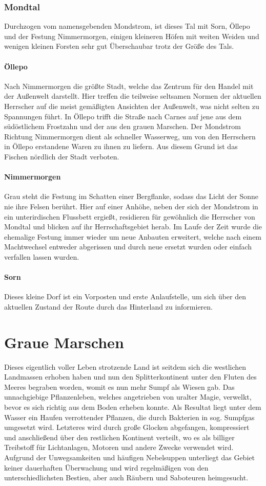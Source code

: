 \documentclass[a4paper,12pt,oneside]{book}
\begin{document}
\subsubsection{Mondtal}
Durchzogen vom namensgebenden Mondstrom, ist dieses Tal mit Sorn, Öllepo und der Festung Nimmermorgen, einigen kleineren Höfen mit weiten Weiden und wenigen kleinen Forsten sehr gut Überschaubar trotz der Größe des Tals.
\paragraph{Öllepo} 
Nach Nimmermorgen die größte Stadt, welche das Zentrum für den Handel mit der Außenwelt darstellt. Hier treffen die teilweise seltsamen Normen der aktuellen Herrscher auf die meist gemäßigten Ansichten der Außenwelt, was nicht selten zu Spannungen führt. In Öllepo trifft die Straße nach Carnes auf jene aus dem südöstlichem Frostzahn und der aus den grauen Marschen. Der Mondstrom Richtung Nimmermorgen dient als schneller Wasserweg, um von den Herrschern in Öllepo erstandene Waren zu ihnen zu liefern. Aus diesem Grund ist das Fischen nördlich der Stadt verboten.%
\paragraph{Nimmermorgen}
Grau steht die Festung im Schatten einer Bergflanke, sodass das Licht der Sonne nie ihre Felsen berührt. Hier auf einer Anhöhe, neben der sich der Mondstrom in ein unterirdischen Flussbett ergießt, residieren für gewöhnlich die Herrscher von Mondtal und blicken auf ihr Herrschaftsgebiet herab. Im Laufe der Zeit wurde die ehemalige Festung immer wieder um neue Anbauten erweitert, welche nach einem Machtwechsel entweder abgerissen und durch neue ersetzt wurden oder einfach verfallen lassen wurden. 
\paragraph{Sorn}
Dieses kleine Dorf ist ein Vorposten und erste Anlaufstelle, um sich über den aktuellen Zustand der Route durch das Hinterland zu informieren. 
\section{Graue Marschen}
Dieses eigentlich voller Leben strotzende Land ist seitdem sich die westlichen Landmassen erhoben haben und nun den Splitterkontinent unter den Fluten des Meeres begraben worden, womit es nun mehr Sumpf als Wiesen gab. Das unnachgiebige Pflanzenleben, welches angetrieben von uralter Magie, verwelkt, bevor es sich richtig aus dem Boden erheben konnte. Als Resultat liegt unter dem Wasser ein Haufen verrottender Pflanzen, die durch Bakterien in sog. Sumpfgas umgesetzt wird. Letzteres wird durch große Glocken abgefangen, kompressiert und anschließend über den restlichen Kontinent verteilt, wo es als billiger Treibstoff für Lichtanlagen, Motoren und andere Zwecke verwendet wird. Aufgrund der Unwegsamkeiten und häufigen Nebelsuppen unterliegt das Gebiet keiner dauerhaften Überwachung und wird regelmäßigen von den unterschiedlichsten Bestien, aber auch Räubern und Saboteuren heimgesucht.
\end{document}
